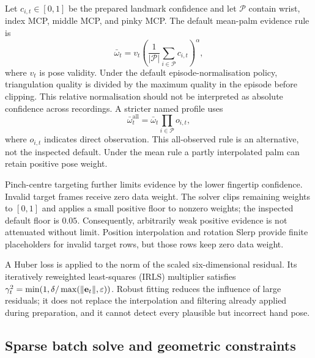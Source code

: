 Let $c_{i,t}\in[0,1]$ be the prepared landmark confidence and let
$\mathcal P$ contain wrist, index MCP, middle MCP, and pinky MCP.
The default mean-palm evidence rule is
\begin{equation}
  \bar\omega_t=v_t
     \left(\frac{1}{|\mathcal P|}\sum_{i\in\mathcal P}c_{i,t}\right)^\alpha,
  \label{eq:conf}
\end{equation}
where $v_t$ is pose validity. Under the default episode-normalisation
policy, triangulation quality is divided by the maximum quality in the
episode before clipping. This relative normalisation should not be
interpreted as absolute confidence across recordings. A stricter named
profile uses
\begin{equation}
  \bar\omega_t^{\mathrm{all}}
      =\bar\omega_t\prod_{i\in\mathcal P}o_{i,t},
  \label{eq:confstrict}
\end{equation}
where $o_{i,t}$ indicates direct observation. This all-observed rule is an
alternative, not the inspected default. Under the mean rule a partly
interpolated palm can retain positive pose weight.

Pinch-centre targeting further limits evidence by the lower fingertip
confidence. Invalid target frames receive zero data weight. The solver
clips remaining weights to $[0,1]$ and applies a small positive floor to
nonzero weights; the inspected default floor is $0.05$. Consequently,
arbitrarily weak positive evidence is not attenuated without limit.
Position interpolation and rotation Slerp provide finite placeholders
for invalid target rows, but those rows keep zero data weight.

A Huber loss is applied to the norm of the scaled six-dimensional residual.
Its iteratively reweighted least-squares (IRLS) multiplier satisfies
$\gamma_t^2=\min(1,\delta/\max(\lVert\mathbf{e}_t\rVert,\varepsilon))$.
Robust fitting reduces the influence of large residuals; it does not
replace the interpolation and filtering already applied during preparation,
and it cannot detect every plausible but incorrect hand pose.

\subsection{Sparse batch solve and geometric constraints}

